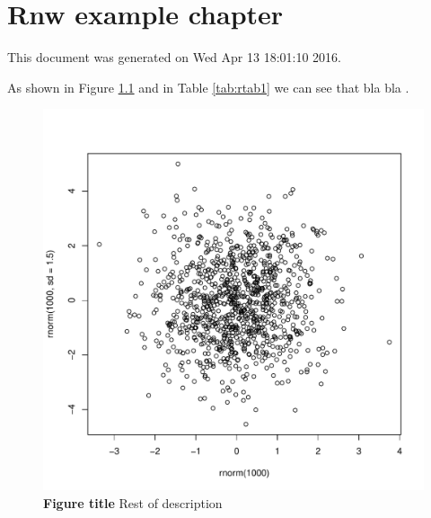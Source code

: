 \chapter{Rnw example chapter}
\label{chap:rnw}





This document was generated on Wed Apr 13 18:01:10 2016.

As shown in Figure \ref{fig:some_fig} and in Table \ref{tab:rtab1} we can see that bla bla \citep{B}.


\begin{knitrout}
\color{fgcolor}\begin{figure}
\includegraphics[width=\maxwidth]{figure/some_fig-1} \caption[{\bf Figure title } Rest of description]{{\bf Figure title } Rest of description}\label{fig:some_fig}
\end{figure}


\end{knitrout}






